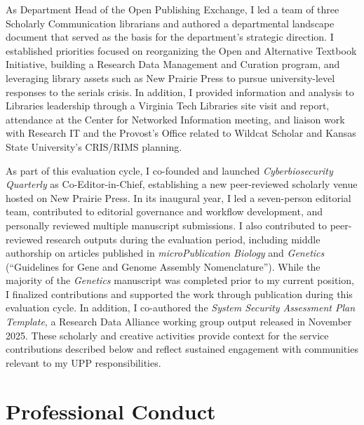 \vspace{\baselineskip}

As Department Head of the Open Publishing Exchange, I led a team of three Scholarly Communication librarians and authored a departmental landscape document that served as the basis for the department’s strategic direction. I established priorities focused on reorganizing the Open and Alternative Textbook Initiative, building a Research Data Management and Curation program, and leveraging library assets such as New Prairie Press to pursue university-level responses to the serials crisis. In addition, I provided information and analysis to Libraries leadership through a Virginia Tech Libraries site visit and report, attendance at the Center for Networked Information meeting, and liaison work with Research IT and the Provost’s Office related to Wildcat Scholar and Kansas State University’s CRIS/RIMS planning.

\vspace{\baselineskip}

As part of this evaluation cycle, I co-founded and launched \textit{Cyberbiosecurity Quarterly} as Co-Editor-in-Chief, establishing a new peer-reviewed scholarly venue hosted on New Prairie Press. In its inaugural year, I led a seven-person editorial team, contributed to editorial governance and workflow development, and personally reviewed multiple manuscript submissions. I also contributed to peer-reviewed research outputs during the evaluation period, including middle authorship on articles published in \textit{microPublication Biology} and \textit{Genetics} (``Guidelines for Gene and Genome Assembly Nomenclature''). While the majority of the \textit{Genetics} manuscript was completed prior to my current position, I finalized contributions and supported the work through publication during this evaluation cycle. In addition, I co-authored the \textit{System Security Assessment Plan Template}, a Research Data Alliance working group output released in November 2025. These scholarly and creative activities provide context for the service contributions described below and reflect sustained engagement with communities relevant to my UPP responsibilities.



\section{Professional Conduct}

